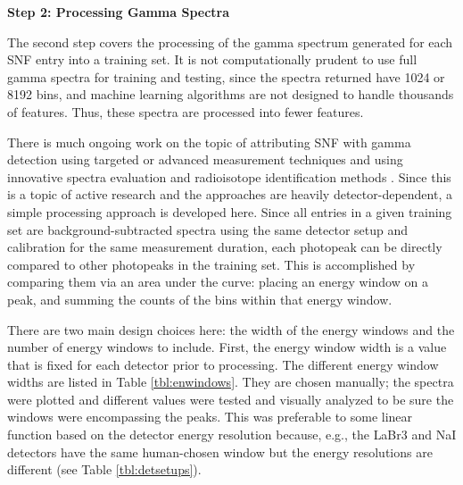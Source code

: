 \noindent \textbf{Step 2: Processing Gamma Spectra}

The second step covers the processing of the gamma spectrum generated for each
\gls{SNF} entry into a training set.  It is not computationally prudent to use
full gamma spectra for training and testing, since the spectra returned have
1024 or 8192 bins, and machine learning algorithms are not designed to handle
thousands of features.  Thus, these spectra are processed into fewer features.

There is much ongoing work on the topic of attributing \gls{SNF} with gamma
detection using targeted or advanced measurement techniques \cite{snf_gamma,
compton_supp, bwr_high-res_gamma} and using innovative spectra evaluation and
radioisotope identification methods \cite{riid_09, rapid_riid_18, sull_gen_07,
sull_valid_15, sull_auto_17, sull_unc_17, dayman_gamma_fp, dayman_gamma_auto}.
Since this is a topic of active research and the approaches are heavily
detector-dependent, a simple processing approach is developed here.  Since all
entries in a given training set are background-subtracted spectra using the
same detector setup and calibration for the same measurement duration, each
photopeak can be directly compared to other photopeaks in the training set.
This is accomplished by comparing them via an area under the curve: placing an
energy window on a peak, and summing the counts of the bins within that energy
window. 

There are two main design choices here: the width of the energy windows and the
number of energy windows to include. First, the energy window width is a value
that is fixed for each detector prior to processing.  The different energy
window widths are listed in Table \ref{tbl:enwindows}.  They are chosen
manually; the spectra were plotted and different values were tested and
visually analyzed to be sure the windows were encompassing the peaks. This was
preferable to some linear function based on the detector energy resolution
because, e.g., the \gls{LaBr3} and \gls{NaI} detectors have the same
human-chosen window but the energy resolutions are different (see Table
\ref{tbl:detsetups}). 

